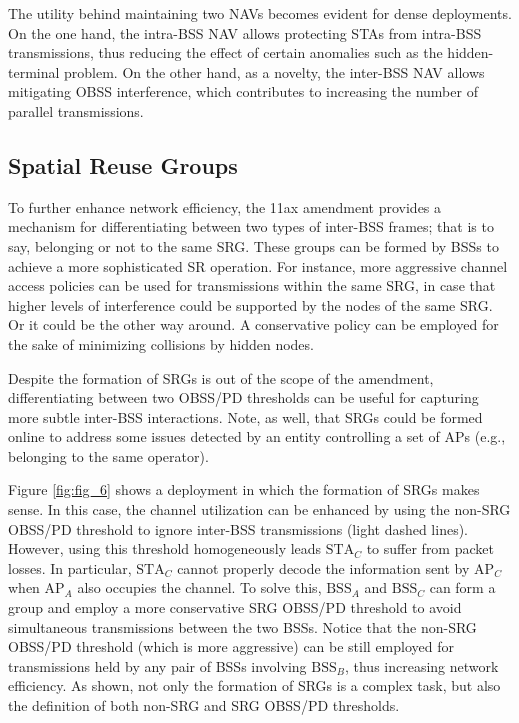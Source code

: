 \documentclass{article}
\begin{document}
The utility behind maintaining two NAVs becomes evident for dense deployments. On the one hand, the intra-BSS NAV allows protecting STAs from intra-BSS transmissions, thus reducing the effect of certain anomalies such as the hidden-terminal problem. On the other hand, as a novelty, the inter-BSS NAV allows mitigating OBSS interference, which contributes to increasing the number of parallel transmissions. 

\subsection{Spatial Reuse Groups}
\label{section:srg}
To further enhance network efficiency, the 11ax amendment provides a mechanism for differentiating between two types of inter-BSS frames; that is to say, belonging or not to the same SRG. These groups can be formed by BSSs to achieve a more sophisticated SR operation. For instance, more aggressive channel access policies can be used for transmissions within the same SRG, in case that higher levels of interference could be supported by the nodes of the same SRG. Or it could be the other way around. A conservative policy can be employed for the sake of minimizing collisions by hidden nodes. 

Despite the formation of SRGs is out of the scope of the amendment, differentiating between two OBSS/PD thresholds can be useful for capturing more subtle inter-BSS interactions. Note, as well, that SRGs could be formed online to address some issues detected by an entity controlling a set of APs (e.g., belonging to the same operator).

Figure \ref{fig:fig_6} shows a deployment in which the formation of SRGs makes sense. In this case, the channel utilization can be enhanced by using the non-SRG OBSS/PD threshold to ignore inter-BSS transmissions (light dashed lines). However, using this threshold homogeneously leads $\text{STA}_C$ to suffer from packet losses. In particular, $\text{STA}_C$ cannot properly decode the information sent by $\text{AP}_C$ when $\text{AP}_A$ also occupies the channel. To solve this, $\text{BSS}_A$ and $\text{BSS}_C$ can form a group and employ a more conservative SRG OBSS/PD threshold to avoid simultaneous transmissions between the two BSSs. Notice that the non-SRG OBSS/PD threshold (which is more aggressive) can be still employed for transmissions held by any pair of BSSs involving $\text{BSS}_B$, thus increasing network efficiency. As shown, not only the formation of SRGs is a complex task, but also the definition of both non-SRG and SRG OBSS/PD thresholds.
\end{document}
